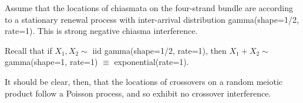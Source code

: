 \documentclass[12pt]{article}
\begin{document}
\begin{enumerate}
Assume that the locations of chiasmata on the four-strand bundle are
according to a stationary renewal process with inter-arrival
distribution gamma(shape=1/2, rate=1).  This is strong negative
chiasma interference.

Recall that if $X_1, X_2 \sim$ iid gamma(shape=1/2, rate=1), then $X_1
+ X_2 \sim$ gamma(shape=1, rate=1) $\equiv$ exponential(rate=1).  

It should be clear, then, that the locations of crossovers on a random
meiotic product follow a Poisson process, and so exhibit no crossover
interference.


\end{enumerate}
\end{document}
